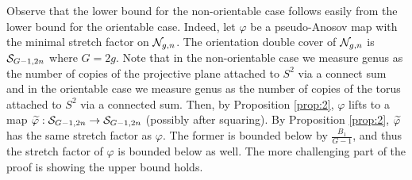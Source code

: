 
Observe that the lower bound for the non-orientable case follows easily from the lower bound for the orientable case.
Indeed, let $\varphi$ be a pseudo-Anosov map with the minimal stretch factor on $\mathcal{N}_{g,n}$. The orientation double cover of $\mathcal{N}_{g,n}$ is $\mathcal{S}_{G-1,2n}$ where $G=2g$.  Note that in the non-orientable case we measure genus as the number of copies of the projective plane attached to $S^2$ via a connect sum and in the orientable case we measure genus as the number of copies of the torus attached to $S^2$ via a connected sum. Then, by Proposition \ref{prop:2},
$\varphi$ lifts to a map $\widetilde{\varphi}:\mathcal{S}_{G-1, 2n}\to\mathcal{S}_{G-1,2n}$ (possibly after squaring). 
By Proposition \ref{prop:2}, $\widetilde{\varphi}$ has the same
stretch factor as $\varphi$. The former is bounded below by $\frac{B_1}{G-1}$, and thus the stretch factor of $\varphi$ is bounded
below as well. The more challenging part of the proof is showing the upper bound holds. %

